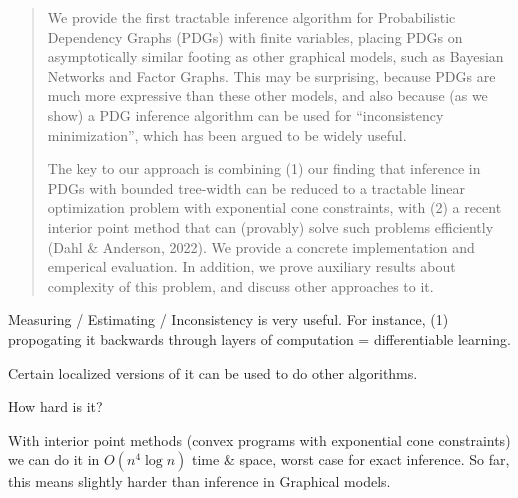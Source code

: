 \documentclass{article}
\author{$\{$Oliver E Richardson, Joseph Y Halpern, Christopher De Sa$\}$}
\begin{document}
\begin{abstract}
    We provide the first tractable inference algorithm for Probabilistic Dependency Graphs (PDGs) with finite variables, placing PDGs on asymptotically similar footing as other graphical models, such as Bayesian Networks and Factor Graphs.
    This may be surprising, because PDGs are much more expressive than these other models, and also because (as we show) a PDG inference algorithm can be used for ``inconsistency minimization'', which has been argued to be widely useful. 
    
    The key to our approach is combining 
    (1) our finding that inference in PDGs with bounded tree-width can be reduced to a tractable linear optimization problem with exponential cone constraints,
    with (2) a recent interior point method that can (provably) solve such problems efficiently (Dahl \& Anderson, 2022).
    We provide a concrete implementation and emperical evaluation.
    In addition, we prove auxiliary results about complexity of this problem, and discuss other approaches to it. 
\end{abstract}

\begin{narrow}

Measuring / Estimating /  Inconsistency is very useful.
For instance, (1) propogating it backwards through layers of computation = differentiable learning. 

Certain localized versions of it can be used to do other algorithms.



How hard is it? 







With interior point methods (convex programs with exponential cone constraints) we can do it in $O(n^4 \log n)$ time \& space, worst case for exact inference. So far, this means slightly harder than inference in Graphical models.





\end{narrow}
\end{document}
